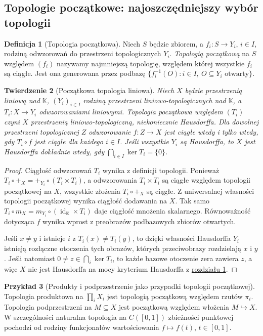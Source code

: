 \documentclass[11pt,a4paper]{article}
\numberwithin{equation}{section}
\theoremstyle{plain}
\newtheorem{twierdzenie}{Twierdzenie}[section]
\theoremstyle{definition}
\newtheorem{definicja}[twierdzenie]{Definicja}
\newtheorem{przyklad}[twierdzenie]{Przykład}
\theoremstyle{remark}
\newcommand{\K}{\mathbb K}
\DeclareMathOperator{\id}{id}
\begin{document}
\subsection{Topologie początkowe: najoszczędniejszy wybór topologii}

\begin{definicja}[Topologia początkowa]
Niech $S$ będzie zbiorem, a $f_i:S\to Y_i$, $i\in I$,
rodziną odwzorowań do przestrzeni topologicznych $Y_i$.
\emph{Topologią początkową} na $S$ względem $(f_i)$
nazywamy najmniejszą topologię, względem której wszystkie
$f_i$ są ciągłe. Jest ona generowana przez podbazę
$\{f_i^{-1}(O):i\in I,\ O\subseteq Y_i\text{ otwarty}\}$.
\end{definicja}

\begin{twierdzenie}[Początkowa topologia liniowa]\label{thm:initial-tvs}
Niech $X$ będzie przestrzenią liniową nad $\K$, $(Y_i)_{i\in I}$
rodziną przestrzeni liniowo-topologicznych nad $\K$,
a $T_i:X\to Y_i$ odwzorowaniami liniowymi.
Topologia początkowa względem $(T_i)$ czyni $X$
przestrzenią liniowo-topologiczną, niekoniecznie Hausdorffa.
Dla dowolnej przestrzeni topologicznej $Z$ odwzorowanie
$f:Z\to X$ jest ciągłe wtedy i tylko wtedy, gdy
$T_i\circ f$ jest ciągłe dla każdego $i\in I$.
Jeśli wszystkie $Y_i$ są Hausdorffa, to $X$ jest Hausdorffa
dokładnie wtedy, gdy $\bigcap_{i\in I}\ker T_i=\{0\}$.
\end{twierdzenie}
\begin{proof}
Ciągłość odwzorowań $T_i$ wynika z definicji topologii.
Ponieważ $T_i\circ+_X=+_{Y_i}\circ(T_i\times T_i)$,
a odwzorowania $T_i\times T_i$ są ciągłe względem
topologii początkowej na $X$, wszystkie złożenia
$T_i\circ+_X$ są ciągłe. Z uniwersalnej własności
topologii początkowej wynika ciągłość dodawania na $X$.
Tak samo $T_i\circ m_X=m_{Y_i}\circ(\id_\K\times T_i)$
daje ciągłość mnożenia skalarnego. Równoważność dotycząca
$f$ wynika wprost z preobrazów podbazowych zbiorów otwartych.

Jeśli $x\ne y$ i istnieje $i$ z $T_i(x)\ne T_i(y)$,
to dzięki własności Hausdorffa $Y_i$ istnieją rozłączne
otoczenia tych obrazów, których przeciwobrazy rozdzielają
$x$ i $y$. Jeśli natomiast $0\ne z\in\bigcap_i\ker T_i$,
to każde bazowe otoczenie zera zawiera $z$, a więc
$X$ nie jest Hausdorffa na mocy kryterium Hausdorffa
z \hyperref[sec:tvs]{rozdziału 1}.
\end{proof}

\begin{przyklad}[Produkty i podprzestrzenie jako przypadki topologii początkowej]
Topologia produktowa na $\prod_iX_i$ jest topologią
początkową względem rzutów $\pi_i$.
Topologia podprzestrzeni na $M\subseteq X$ jest
początkową względem włożenia $M\hookrightarrow X$.
W szczególności naturalna topologia na $C([0,1])$
zbieżności punktowej pochodzi od rodziny funkcjonałów
wartościowania $f\mapsto f(t)$, $t\in[0,1]$.
\end{przyklad}
\end{document}
